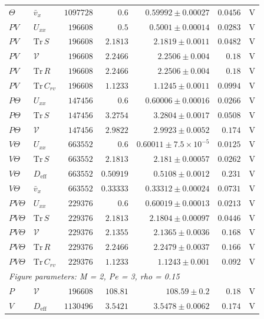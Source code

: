\begin{longtable}{llrrrrc}
$\Theta$ & $\bar v_x$ & $1097728$ & $0.6$ & $0.59992 \pm 0.00027$ & $0.0456$ & V \\
$PV$ & $U_{xx}$ & $196608$ & $0.5$ & $0.5001 \pm 0.00014$ & $0.0283$ & V \\
$PV$ & $\mathrm{Tr}\,S$ & $196608$ & $2.1813$ & $2.1819 \pm 0.0011$ & $0.0482$ & V \\
$PV$ & $\mathcal V$ & $196608$ & $2.2466$ & $2.2506 \pm 0.004$ & $0.18$ & V \\
$PV$ & $\mathrm{Tr}\,R$ & $196608$ & $2.2466$ & $2.2506 \pm 0.004$ & $0.18$ & V \\
$PV$ & $\mathrm{Tr}\,C_{rv}$ & $196608$ & $1.1233$ & $1.1245 \pm 0.0011$ & $0.0994$ & V \\
$P\Theta$ & $U_{xx}$ & $147456$ & $0.6$ & $0.60006 \pm 0.00016$ & $0.0266$ & V \\
$P\Theta$ & $\mathrm{Tr}\,S$ & $147456$ & $3.2754$ & $3.2804 \pm 0.0017$ & $0.0508$ & V \\
$P\Theta$ & $\mathcal V$ & $147456$ & $2.9822$ & $2.9923 \pm 0.0052$ & $0.174$ & V \\
$V\Theta$ & $U_{xx}$ & $663552$ & $0.6$ & $0.60011 \pm 7.5\times10^{-5}$ & $0.0125$ & V \\
$V\Theta$ & $\mathrm{Tr}\,S$ & $663552$ & $2.1813$ & $2.181 \pm 0.00057$ & $0.0262$ & V \\
$V\Theta$ & $D_{\mathrm{eff}}$ & $663552$ & $0.50919$ & $0.5108 \pm 0.0012$ & $0.231$ & V \\
$V\Theta$ & $\bar v_x$ & $663552$ & $0.33333$ & $0.33312 \pm 0.00024$ & $0.0731$ & V \\
$PV\Theta$ & $U_{xx}$ & $229376$ & $0.6$ & $0.60019 \pm 0.00013$ & $0.0213$ & V \\
$PV\Theta$ & $\mathrm{Tr}\,S$ & $229376$ & $2.1813$ & $2.1804 \pm 0.00097$ & $0.0446$ & V \\
$PV\Theta$ & $\mathcal V$ & $229376$ & $2.1355$ & $2.1365 \pm 0.0036$ & $0.168$ & V \\
$PV\Theta$ & $\mathrm{Tr}\,R$ & $229376$ & $2.2466$ & $2.2479 \pm 0.0037$ & $0.166$ & V \\
$PV\Theta$ & $\mathrm{Tr}\,C_{rv}$ & $229376$ & $1.1233$ & $1.1243 \pm 0.001$ & $0.092$ & V \\
\multicolumn{7}{l}{\textit{Figure parameters: M = 2, Pe = 3, rho = 0.15}} \\
$P$ & $\mathcal V$ & $196608$ & $108.81$ & $108.59 \pm 0.2$ & $0.18$ & V \\
$V$ & $D_{\mathrm{eff}}$ & $1130496$ & $3.5421$ & $3.5478 \pm 0.0062$ & $0.174$ & V \\

\end{longtable}
